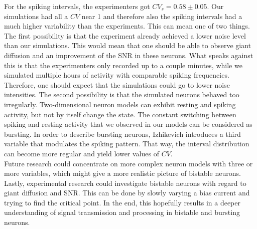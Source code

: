 \documentclass[12pt,a4paper]{article}
\begin{document}
For the spiking intervals, the experimenters got $CV_s=0.58\pm0.05$. Our simulations had all a $CV$ near 1 and therefore also the spiking intervals had a much higher variability than the experiments. This can mean one of two things. The first possibility is that the experiment already achieved a lower noise level than our simulations. This would mean that one should be able to observe giant diffusion and an improvement of the SNR in these neurons. What speaks against this is that the experimenters only recorded up to a couple minutes, while we simulated multiple hours of activity with comparable spiking frequencies. Therefore, one should expect that the simulations could go to lower noise intensities. The second possibility is that the simulated neurons behaved too irregularly. Two-dimensional neuron models can exhibit resting and spiking activity, but not by itself change the state. The constant switching between spiking and resting activity that we observed in our models can be considered as bursting. In order to describe bursting neurons, Izhikevich\cite{izi} introduces a third variable that modulates the spiking pattern. That way, the interval distribution can become more regular and yield lower values of $CV$. \\
Future research could concentrate on more complex neuron models with three or more variables, which might give a more realistic picture of bistable neurons. Lastly, experimental research could investigate bistable neurons with regard to giant diffusion and SNR. This can be done by slowly varying a bias current and trying to find the critical point. In the end, this hopefully results in a deeper understanding of signal transmission and processing in bistable and bursting neurons. 
\newpage



\end{document}
